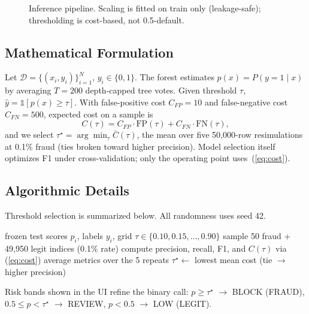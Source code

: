 \documentclass[conference]{IEEEtran}
\begin{document}
\begin{figure}[htbp]
\centerline{}
\caption{Inference pipeline. Scaling is fitted on train only
(leakage-safe); thresholding is cost-based, not 0.5-default.}
\label{fig:pipe}
\end{figure}

\subsection{Mathematical Formulation}
Let $\mathcal{D} = \{(x_i, y_i)\}_{i=1}^{N}$, $y_i \in \{0,1\}$.
The forest estimates $p(x) = P(y=1 \mid x)$ by averaging $T=200$
depth-capped tree votes. Given threshold $\tau$, $\hat{y} =
\mathbb{1}[p(x) \ge \tau]$. With false-positive cost $C_{FP}=10$ and
false-negative cost $C_{FN}=500$, expected cost on a sample is
\begin{equation}
C(\tau) = C_{FP}\cdot \mathrm{FP}(\tau) + C_{FN}\cdot \mathrm{FN}(\tau),
\label{eq:cost}
\end{equation}
and we select $\tau^\star = \arg\min_\tau \bar{C}(\tau)$, the mean
over five 50,000-row resimulations at 0.1\% fraud (ties broken toward
higher precision). Model selection itself optimizes F1 under
cross-validation; only the operating point uses~(\ref{eq:cost}).

\subsection{Algorithmic Details}
Threshold selection is summarized below. All randomness uses seed 42.
\begin{algorithmic}[1]
\REQUIRE frozen test scores $p_i$, labels $y_i$, grid
$\tau \in \{0.10, 0.15, \dots, 0.90\}$
\STATE sample 50 fraud + 49,950 legit indices (0.1\% rate)
\STATE compute precision, recall, F1, and $C(\tau)$ via (\ref{eq:cost})
\ENDFOR
\STATE average metrics over the 5 repeats
\ENDFOR
\STATE $\tau^\star \gets$ lowest mean cost (tie $\to$ higher precision)
\end{algorithmic}

Risk bands shown in the UI refine the binary call: $p \ge \tau^\star$
$\to$ BLOCK (FRAUD), $0.5 \le p < \tau^\star$ $\to$ REVIEW,
$p < 0.5$ $\to$ LOW (LEGIT).
\end{document}
